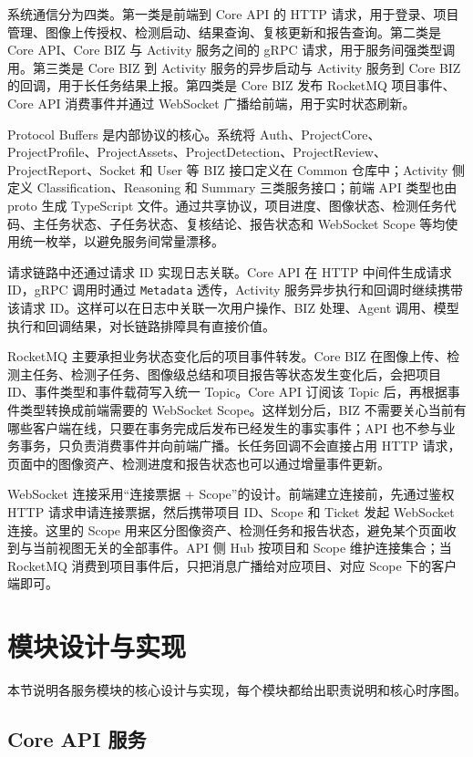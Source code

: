 系统通信分为四类。第一类是前端到 Core API 的 HTTP 请求，用于登录、项目管理、图像上传授权、检测启动、结果查询、复核更新和报告查询。第二类是 Core API、Core BIZ 与 Activity 服务之间的 gRPC 请求，用于服务间强类型调用。第三类是 Core BIZ 到 Activity 服务的异步启动与 Activity 服务到 Core BIZ 的回调，用于长任务结果上报。第四类是 Core BIZ 发布 RocketMQ 项目事件、Core API 消费事件并通过 WebSocket 广播给前端，用于实时状态刷新。

Protocol Buffers 是内部协议的核心。系统将 Auth、ProjectCore、ProjectProfile、ProjectAssets、ProjectDetection、ProjectReview、ProjectReport、Socket 和 User 等 BIZ 接口定义在 Common 仓库中；Activity 侧定义 Classification、Reasoning 和 Summary 三类服务接口；前端 API 类型也由 proto 生成 TypeScript 文件。通过共享协议，项目进度、图像状态、检测任务代码、主任务状态、子任务状态、复核结论、报告状态和 WebSocket Scope 等均使用统一枚举，以避免服务间常量漂移。

请求链路中还通过请求 ID 实现日志关联。Core API 在 HTTP 中间件生成请求 ID，gRPC 调用时通过 \texttt{Metadata} 透传，Activity 服务异步执行和回调时继续携带该请求 ID。这样可以在日志中关联一次用户操作、BIZ 处理、Agent 调用、模型执行和回调结果，对长链路排障具有直接价值。

RocketMQ 主要承担业务状态变化后的项目事件转发。Core BIZ 在图像上传、检测主任务、检测子任务、图像级总结和项目报告等状态发生变化后，会把项目 ID、事件类型和事件载荷写入统一 Topic。Core API 订阅该 Topic 后，再根据事件类型转换成前端需要的 WebSocket Scope。这样划分后，BIZ 不需要关心当前有哪些客户端在线，只要在事务完成后发布已经发生的事实事件；API 也不参与业务事务，只负责消费事件并向前端广播。长任务回调不会直接占用 HTTP 请求，页面中的图像资产、检测进度和报告状态也可以通过增量事件更新。

WebSocket 连接采用“连接票据 + Scope”的设计。前端建立连接前，先通过鉴权 HTTP 请求申请连接票据，然后携带项目 ID、Scope 和 Ticket 发起 WebSocket 连接。这里的 Scope 用来区分图像资产、检测任务和报告状态，避免某个页面收到与当前视图无关的全部事件。API 侧 Hub 按项目和 Scope 维护连接集合；当 RocketMQ 消费到项目事件后，只把消息广播给对应项目、对应 Scope 下的客户端即可。

\section{模块设计与实现}
\label{sec:implementation-module-design-and-implementation}

本节说明各服务模块的核心设计与实现，每个模块都给出职责说明和核心时序图。

\subsection{Core API 服务}
\label{subsec:implementation-api-service}

